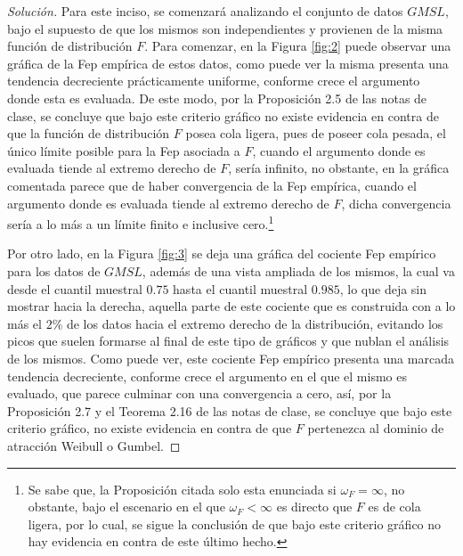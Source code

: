 \documentclass[10.5pt,notitlepage]{article}
\newenvironment{solucion}
  {\begin{proof}[Solución]}
  {\end{proof}}
\theoremstyle{plain}
\begin{document}
\begin{solucion}
Para este inciso, se comenzará analizando el conjunto de datos \(GMSL\), bajo el supuesto de que los mismos son independientes y provienen de la misma función de distribución \(F\). Para comenzar, en la Figura \ref{fig:2} puede observar una gráfica de la Fep empírica de estos datos, como puede ver la misma presenta una tendencia decreciente prácticamente uniforme, conforme crece el argumento donde esta es evaluada. De este modo, por la Proposición 2.5 de las notas de clase, se concluye que bajo este criterio gráfico no existe evidencia en contra de que la función de distribución \(F\) posea cola ligera, pues de poseer cola pesada, el único límite posible para la Fep asociada a \(F\), cuando el argumento donde es evaluada tiende al extremo derecho de \(F\), sería infinito, no obstante, en la gráfica comentada parece que de haber convergencia de la Fep empírica, cuando el argumento donde es evaluada tiende al extremo derecho de \(F\), dicha convergencia sería a lo más a un límite finito e inclusive cero.\footnote{Se sabe que, la Proposición citada solo esta enunciada si \(\omega_{F} = \infty\), no obstante, bajo el escenario en el que \(\omega_{F}< \infty\) es directo que \(F\) es de cola ligera, por lo cual, se sigue la conclusión de que bajo este criterio gráfico no hay evidencia en contra de este último hecho.}

Por otro lado, en la Figura \ref{fig:3} se deja una gráfica del cociente Fep empírico para los datos de \(GMSL\), además de una vista ampliada de los mismos, la cual va desde el cuantil muestral \(0.75\) hasta el cuantil muestral \(0.985\), lo que deja sin mostrar hacia la derecha, aquella parte de este cociente que es construida con a lo más el \(2\%\) de los datos hacia el extremo derecho de la distribución, evitando los picos que suelen formarse al final de este tipo de gráficos y que nublan el análisis de los mismos. Como puede ver, este cociente Fep empírico presenta una marcada tendencia decreciente, conforme crece el argumento en el que el mismo es evaluado, que parece culminar con una convergencia a cero, así, por la Proposición 2.7 y el Teorema 2.16 de las notas de clase, se concluye que bajo este criterio gráfico, no existe evidencia en contra de que \(F\) pertenezca al dominio de atracción Weibull o Gumbel.


\end{solucion}
\end{document}
